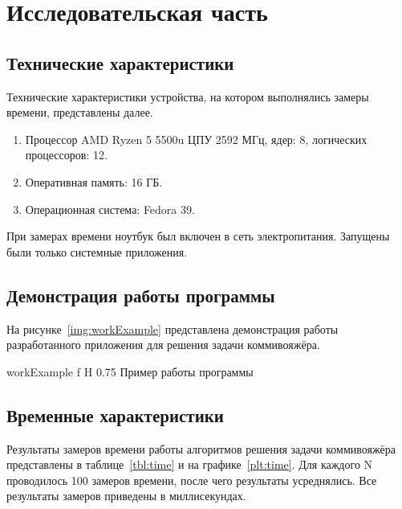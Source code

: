 \chapter{Исследовательская часть}
\section{Технические характеристики}

Технические характеристики устройства, на котором выполнялись замеры времени, представлены далее.

\begin{enumerate}
	\item Процессор	AMD Ryzen 5 5500u ЦПУ 2592 МГц, ядер: 8, логических процессоров: 12.
	\item Оперативная память: 16 ГБ.
	\item Операционная система: Fedora 39.
\end{enumerate}

При замерах времени ноутбук был включен в сеть электропитания. Запущены были только системные приложения.

\section{Демонстрация работы программы}

На рисунке~\ref{img:workExample} представлена демонстрация работы разработанного приложения для решения задачи коммивояжёра.

{workExample}
{f}
{H}
{0.75\textwidth}
{Пример работы программы}

\section{Временные характеристики}

Результаты замеров времени работы алгоритмов решения задачи коммивояжёра представлены в таблице~\ref{tbl:time} и на графике~\ref{plt:time}. Для каждого N проводилось 100 замеров времени, после чего результаты усреднялись. Все результаты замеров приведены в миллисекундах.

